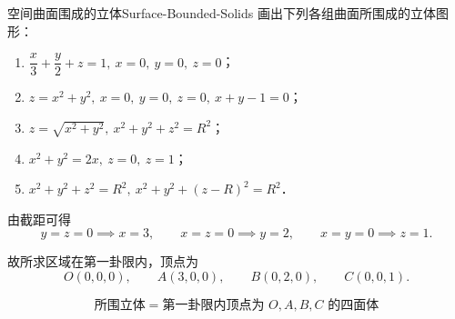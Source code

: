 \begin{problem}{空间曲面围成的立体}{Surface-Bounded-Solids}
    画出下列各组曲面所围成的立体图形：
    \begin{enumerate}
        \item $\dfrac{x}{3}+\dfrac{y}{2}+z=1,\ x=0,\ y=0,\ z=0$；
        \item $z=x^2+y^2,\ x=0,\ y=0,\ z=0,\ x+y-1=0$；
        \item $z=\sqrt{x^2+y^2},\ x^2+y^2+z^2=R^2$；
        \item $x^2+y^2=2x,\ z=0,\ z=1$；
        \item $x^2+y^2+z^2=R^2,\ x^2+y^2+(z-R)^2=R^2$．
    \end{enumerate}
\end{problem}

\begin{solution}

    由截距可得
    \begin{equation}
        y=z=0 \implies x=3,\qquad x=z=0 \implies y=2,\qquad x=y=0 \implies z=1.
    \end{equation}

    故所求区域在第一卦限内，顶点为
    \begin{equation}
        O(0,0,0),\qquad A(3,0,0),\qquad B(0,2,0),\qquad C(0,0,1).
    \end{equation}

    \begin{center}
    \end{center}

    \begin{equation}
        \boxed{\text{所围立体}= \text{第一卦限内顶点为 }O,A,B,C\text{ 的四面体}}
    \end{equation}


\end{solution}
